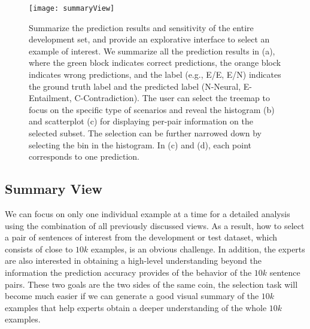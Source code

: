 \begin{figure}[htbp]
\centering
 \texttt{[image: summaryView]}
 \caption{
Summarize the prediction results and sensitivity of the entire development set, and provide an explorative interface to select an example of interest.
We summarize all the prediction results in (a), where the green block indicates correct predictions, the orange block indicates wrong predictions, and the label (e.g., E/E, E/N) indicates the ground truth label and the predicted label (N-Neural, E-Entailment, C-Contradiction).
%
The user can select the treemap to focus on the specific type of scenarios and reveal the histogram (b) and scatterplot (c) for displaying per-pair information on the selected subset.
The selection can be further narrowed down by selecting the bin in the histogram.
In (c) and (d), each point corresponds to one prediction.
 }
\label{fig:summaryView}
\end{figure}

\subsection{Summary View}
\label{sec:allPairs}
We can focus on only one individual example at a time for a detailed analysis using the combination of all previously discussed views. As a result, how to select a pair of sentences of interest from the development or test dataset, which consists of close to $10k$ examples, is an obvious challenge.
In addition, the experts are also interested in obtaining a high-level understanding beyond the information the prediction accuracy provides of the behavior of the $10k$ sentence pairs.
%
These two goals are the two sides of the same coin, the selection task will become much easier if we can generate a good visual summary of the $10k$ examples that help experts obtain a deeper understanding of the whole $10k$ examples.

